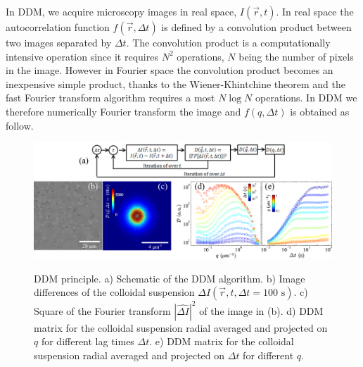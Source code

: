 \documentclass[prb,reprint,amsmath,amssymb]{revtex4-1}
\newcommand{\tg}[1]{{\color{magenta}#1}} %
\begin{document}
\tg{In DDM, we acquire microscopy images in real space, $I(\vec{r}, t)$. In real space the autocorrelation function $f(\vec{r}, \Delta t)$ is defined by a convolution product between two images separated by $\Delta t$. The convolution product is a computationally intensive operation since it requires $N^2$ operations, $N$ being the number of pixels in the image. However in Fourier space the convolution product becomes an inexpensive simple product, thanks to the Wiener-Khintchine theorem and the fast Fourier transform algorithm requires a most $N\log N$ operations}. In DDM  we therefore numerically Fourier transform the image and $f(q, \Delta t)$ is obtained as follow.

\begin{figure}
	\includegraphics[width=\linewidth]{Graph.pdf}\\
	\caption{\tg{DDM principle. a) Schematic of the DDM algorithm. b) Image differences of the colloidal suspension $\Delta I(\vec{r}, t,\Delta t=100 \text{ s})$. c) Square of the Fourier transform $|\widehat{\Delta I}|^2$ of the image in  (b). d) DDM matrix for the colloidal suspension radial averaged and projected on $q$ for different lag times $\Delta t$. e) DDM matrix for the colloidal suspension radial averaged and projected on $\Delta t$ for different $q$.}}
	\label{fig:D}
\end{figure}
\end{document}
